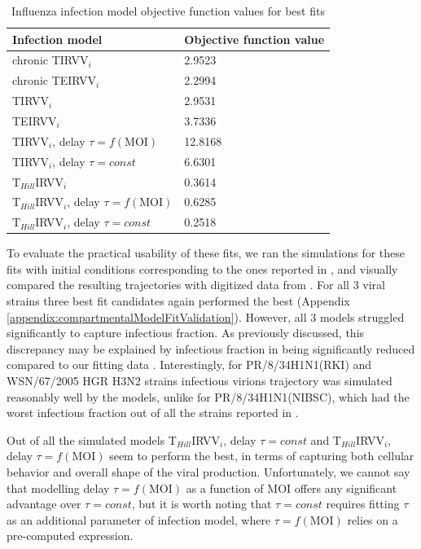 \begin{table}[h!]
\centering
\caption[Influenza infection model objective function values for best fits]{Influenza infection model objective function values for best fits}
\label{table:ModelObjFunction}

\begin{tabular}{p{8cm} p{3cm}}
\hline 
\textbf{Infection model} & \textbf{Objective function value}\\
\hline
chronic TIRVV$_i$ & 2.9523\\
chronic TEIRVV$_i$ & 2.2994\\
\hline
TIRVV$_i$ & 2.9531\\
TEIRVV$_i$ &  3.7336\\
TIRVV$_i$, delay $\tau = f(\text{MOI})$ & 12.8168\\
TIRVV$_i$, delay $\tau = const$ & 6.6301\\
T$_{Hill}$IRVV$_i$ & 0.3614\\
T$_{Hill}$IRVV$_i$, delay $\tau = f(\text{MOI})$ & 0.6285\\
T$_{Hill}$IRVV$_i$, delay $\tau = const$ & 0.2518\\
\hline
\end{tabular}
\end{table}

To evaluate the practical usability of these fits, we ran the simulations for these fits with initial conditions corresponding to the ones reported in \cite{schulze2009infection}, and visually compared the resulting trajectories with digitized data from \cite{schulze2009infection}. For all 3 viral strains three best fit candidates again performed the best (Appendix \ref{appendix:compartmentalModelFitValidation}). However, all 3 models struggled significantly to capture infectious fraction. As previously discussed, this discrepancy may be explained by infectious fraction in \cite{schulze2009infection} being significantly reduced compared to our fitting data \cite{rudiger2019multiscale}. Interestingly, for PR/8/34H1N1(RKI) and WSN/67/2005 HGR H3N2 strains infectious virions trajectory was simulated reasonably well by the models, unlike for PR/8/34H1N1(NIBSC), which had the worst infectious fraction out of all the strains reported in \cite{schulze2009infection}.

Out of all the simulated models T$_{Hill}$IRVV$_i$, delay $\tau = const$ and T$_{Hill}$IRVV$_i$, delay $\tau = f(\text{MOI})$ seem to perform the best, in terms of capturing both cellular behavior and overall shape of the viral production. Unfortunately, we cannot say that modelling delay $\tau = f(\text{MOI})$ as a function of MOI offers any significant advantage over $\tau = const$, but it is worth noting that $\tau = const$ requires fitting $\tau$ as an additional parameter of infection model, where $\tau = f(\text{MOI})$ relies on a pre-computed expression.

